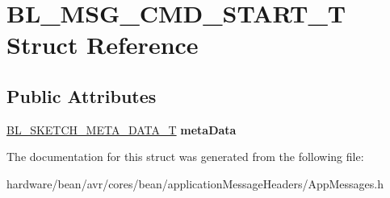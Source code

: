 \hypertarget{struct_b_l___m_s_g___c_m_d___s_t_a_r_t___t}{}\section{B\+L\+\_\+\+M\+S\+G\+\_\+\+C\+M\+D\+\_\+\+S\+T\+A\+R\+T\+\_\+T Struct Reference}
\label{struct_b_l___m_s_g___c_m_d___s_t_a_r_t___t}
\subsection*{Public Attributes}
\begin{DoxyCompactItemize}
\item 
\hyperlink{struct_b_l___s_k_e_t_c_h___m_e_t_a___d_a_t_a___t}{B\+L\+\_\+\+S\+K\+E\+T\+C\+H\+\_\+\+M\+E\+T\+A\+\_\+\+D\+A\+T\+A\+\_\+T} {\bfseries meta\+Data}\hypertarget{struct_b_l___m_s_g___c_m_d___s_t_a_r_t___t_ae10257f15699ce3b59839bad5767ae06}{}\label{struct_b_l___m_s_g___c_m_d___s_t_a_r_t___t_ae10257f15699ce3b59839bad5767ae06}

\end{DoxyCompactItemize}


The documentation for this struct was generated from the following file\+:\begin{DoxyCompactItemize}
\item 
hardware/bean/avr/cores/bean/application\+Message\+Headers/App\+Messages.\+h\end{DoxyCompactItemize}
